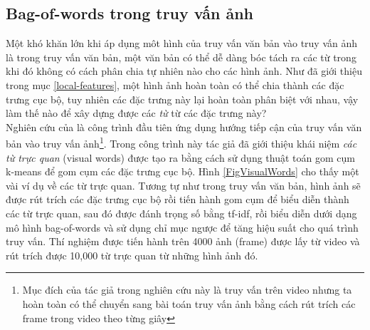 \subsection{Bag-of-words trong truy vấn ảnh}
Một khó khăn lớn khi áp dụng môt hình của truy vấn văn bản vào truy vấn ảnh là trong truy vấn văn bản, một văn bản có thể dễ dàng bóc tách ra các từ trong khi đó không có cách phân chia tự nhiên nào cho các hình ảnh. Như đã giới thiệu trong mục \ref{local-features}, một hình ảnh hoàn toàn có thể chia thành các đặc trưng cục bộ, tuy nhiên các đặc trưng này lại hoàn toàn phân biệt với nhau, vậy làm thế nào để xây dựng được các \textit{từ} từ các đặc trưng này?\\
Nghiên cứu của \cite{sivic2003video} là công trình đầu tiên ứng dụng hướng tiếp cận của truy vấn văn bản vào truy vấn ảnh\footnote{Mục đích của tác giả trong nghiên cứu này là truy vấn trên video nhưng ta hoàn toàn có thể chuyển sang bài toán truy vấn ảnh bằng cách rút trích các frame trong video theo từng giây}. Trong công trình này tác giả đã giới thiệu khái niệm \textit{các từ trực quan} (visual words) được tạo ra bằng cách sử dụng thuật toán gom cụm k-means để gom cụm các đặc trưng cục bộ. Hình \ref{FigVisualWords} cho thấy một vài ví dụ về các từ trực quan. Tương tự như trong truy vấn văn bản, hình ảnh sẽ được rút trích các đặc trưng cục bộ rồi tiến hành gom cụm để biểu diễn thành các từ trực quan, sau đó được đánh trọng số bằng tf-idf, rồi biểu diễn dưới dạng mô hình bag-of-words và sử dụng chỉ mục ngược để tăng hiệu suất cho quá trình truy vấn. Thí nghiệm được tiến hành trên 4000 ảnh (frame) được lấy từ video và rút trích được 10,000 từ trực quan từ những hình ảnh đó.\\
